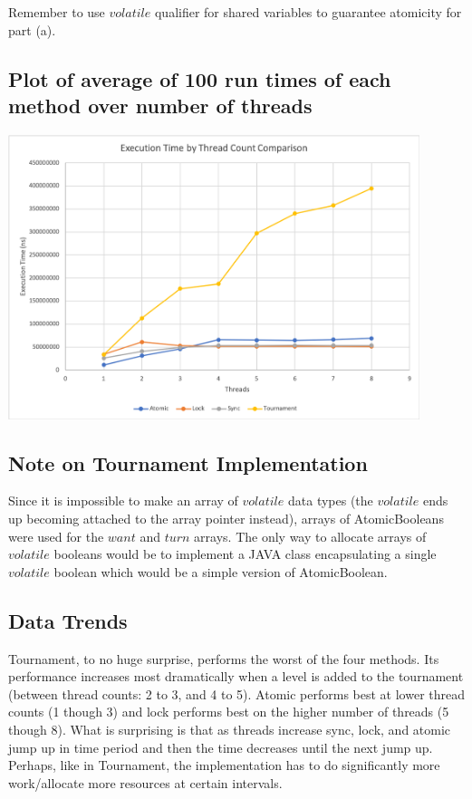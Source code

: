 \documentclass{article}
\begin{document}
Remember to use $volatile$ qualifier for shared variables to guarantee
atomicity for part (a).

\subsection{Plot of average of 100 run times of each method over number of threads}
\includegraphics[width=12cm]{aggregate}

\subsection{Note on Tournament Implementation}
Since it is impossible to make an array of $volatile$ data types (the $volatile$ ends up becoming attached to the array pointer instead), arrays of AtomicBooleans were used for the $want$ and $turn$ arrays. The only way to allocate arrays of $volatile$ booleans would be to implement a JAVA class encapsulating a single $volatile$ boolean which would be a simple version of AtomicBoolean.

\subsection{Data Trends}
Tournament, to no huge surprise, performs the worst of the four methods. Its performance increases most dramatically when a level is added to the tournament (between thread counts: 2 to 3, and 4 to 5). Atomic performs best at lower thread counts (1 though 3) and lock performs best on the higher number of threads (5 though 8). What is surprising is that as threads increase sync, lock, and atomic jump up in time period and then the time decreases until the next jump up. Perhaps, like in Tournament, the implementation has to do significantly more work/allocate more resources at certain intervals.  
\end{document}
